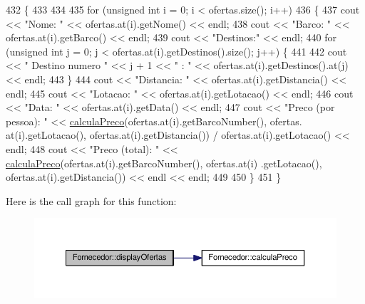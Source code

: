 \begin{DoxyCode}
432                                 \{
433 
434 
435     \textcolor{keywordflow}{for} (\textcolor{keywordtype}{unsigned} \textcolor{keywordtype}{int} i = 0; i < ofertas.size(); i++)
436     \{
437         cout << \textcolor{stringliteral}{"Nome: "} << ofertas.at(i).getNome() << endl;
438         cout << \textcolor{stringliteral}{"Barco: "} << ofertas.at(i).getBarco() << endl;
439         cout << \textcolor{stringliteral}{"Destinos:"} << endl;
440         \textcolor{keywordflow}{for} (\textcolor{keywordtype}{unsigned} \textcolor{keywordtype}{int} j = 0; j < ofertas.at(i).getDestinos().size(); j++) \{
441 
442             cout << \textcolor{stringliteral}{"   Destino numero "} << j + 1 << \textcolor{stringliteral}{" : "} << ofertas.at(i).getDestinos().at(j) << endl;
443         \}
444         cout << \textcolor{stringliteral}{"Distancia: "} << ofertas.at(i).getDistancia() << endl;
445         cout << \textcolor{stringliteral}{"Lotacao: "} << ofertas.at(i).getLotacao() << endl;
446         cout << \textcolor{stringliteral}{"Data: "} << ofertas.at(i).getData() << endl;
447         cout << \textcolor{stringliteral}{"Preco (por pessoa): "} << \hyperlink{classFornecedor_a977992e1dd6370a599e730d9883be277}{calculaPreco}(ofertas.at(i).getBarcoNumber(), ofertas.
      at(i).getLotacao(), ofertas.at(i).getDistancia()) / ofertas.at(i).getLotacao() << endl;
448         cout << \textcolor{stringliteral}{"Preco (total): "} << \hyperlink{classFornecedor_a977992e1dd6370a599e730d9883be277}{calculaPreco}(ofertas.at(i).getBarcoNumber(), ofertas.at(i)
      .getLotacao(), ofertas.at(i).getDistancia()) << endl << endl;
449 
450     \}
451 \}
\end{DoxyCode}


Here is the call graph for this function\+:
\nopagebreak
\begin{figure}[H]
\begin{center}
\leavevmode
\includegraphics[width=350pt]{classFornecedor_a858875f921d2eebb652c4b7628f95c71_cgraph}
\end{center}
\end{figure}



